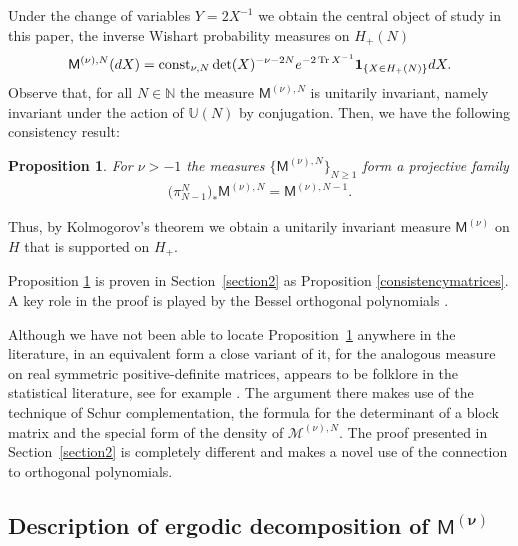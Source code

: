 \documentclass[11pt]{article}
\numberwithin{equation}{section}
\newtheorem{Proposition}[Theorem]{Proposition}
{ \theoremstyle{definition}
\newtheorem{Definition}[Theorem]{Definition}
\newtheorem{Remark}[Theorem]{Remark} }
\begin{document}
Under the change of variables $Y=2X^{-1}$ we obtain the central object of study in this paper, the inverse Wishart probability measures on $H_+(N)$
\begin{align}\label{MeasureDefinition}
\mathsf{M}^{(\nu),N}({\rm d}X)= \operatorname{const}_{\nu, N} \det(X)^{-\nu-2N} {\rm e}^{-2\operatorname{Tr}X^{-1}}\mathbf{1}_{ \{X \in H_+(N) \}}{\rm d}X.
\end{align}
Observe that, for all $N \in \mathbb{N}$ the measure $\mathsf{M}^{(\nu),N}$ is unitarily invariant, namely invariant under the action of $\mathbb{U}(N)$ by conjugation. Then, we have the following consistency result:

\begin{Proposition}\label{ConsistencyIntro} For $\nu >-1$ the measures $\big\{\mathsf{M}^{(\nu),N}\big\}_{N\ge 1}$ form a projective family
\begin{gather*}
\big(\pi_{N-1}^N\big)_*\mathsf{M}^{(\nu),N}=\mathsf{M}^{(\nu),N-1}.
\end{gather*}
\end{Proposition}

Thus, by Kolmogorov's theorem we obtain a unitarily invariant measure $\mathsf{M}^{(\nu)}$ on $H$ that is supported on $H_{+}$.

Proposition \ref{ConsistencyIntro} is proven in Section~\ref{section2} as Proposition \ref{consistencymatrices}. A key role in the proof is played by the Bessel orthogonal polynomials \cite{BesselPolynomials}.

\begin{Remark}Although we have not been able to locate Proposition~\ref{ConsistencyIntro} anywhere in the lite\-ra\-ture, in an equivalent form a close variant of it, for the analogous measure on real symmetric positive-definite matrices, appears to be folklore in the statistical literature, see for example \cite[Chapter~3]{StatisticalMatrixAnalysis}. The argument there makes use of the technique of Schur complementation, the formula for the determinant of a block matrix and the special form of the density of $\mathcal{M}^{(\nu),N}$. The proof presented in Section~\ref{section2} is completely different and makes a novel use of the connection to orthogonal polynomials.
\end{Remark}

\subsection[Description of ergodic decomposition of $\mathsf{M}^{(\nu)}$]{Description of ergodic decomposition of $\boldsymbol{\mathsf{M}^{(\nu)}}$}\label{section1.4}
\end{document}
